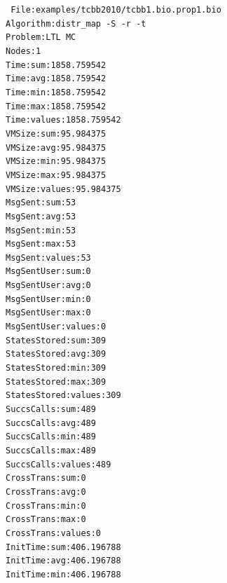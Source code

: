 \documentclass[11pt,final,oneside]{fithesis}
\begin{document}
{\tt\noindent
File:examples/tcbb2010/tcbb1.bio.prop1.bio\\
Algorithm:distr\_map -S -r -t\\
Problem:LTL MC\\
Nodes:1\\
Time:sum:1858.759542\\
Time:avg:1858.759542\\
Time:min:1858.759542\\
Time:max:1858.759542\\
Time:values:1858.759542\\
VMSize:sum:95.984375\\
VMSize:avg:95.984375\\
VMSize:min:95.984375\\
VMSize:max:95.984375\\
VMSize:values:95.984375\\
MsgSent:sum:53\\
MsgSent:avg:53\\
MsgSent:min:53\\
MsgSent:max:53\\
MsgSent:values:53\\
MsgSentUser:sum:0\\
MsgSentUser:avg:0\\
MsgSentUser:min:0\\
MsgSentUser:max:0\\
MsgSentUser:values:0\\
StatesStored:sum:309\\
StatesStored:avg:309\\
StatesStored:min:309\\
StatesStored:max:309\\
StatesStored:values:309\\
SuccsCalls:sum:489\\
SuccsCalls:avg:489\\
SuccsCalls:min:489\\
SuccsCalls:max:489\\
SuccsCalls:values:489\\
CrossTrans:sum:0\\
CrossTrans:avg:0\\
CrossTrans:min:0\\
CrossTrans:max:0\\
CrossTrans:values:0\\
InitTime:sum:406.196788\\
InitTime:avg:406.196788\\
InitTime:min:406.196788\\
}
\end{document}

